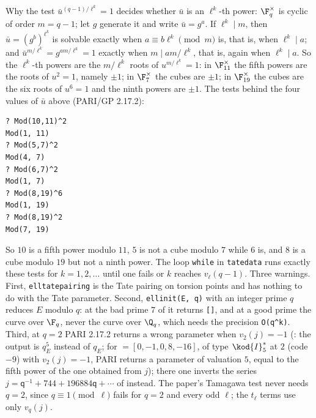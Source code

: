 \begin{sloppypar}
\begin{example}
Why the test $\bar u^{(q-1)/\ell^k}=1$ decides whether $\bar u$ is an $\ell^k$-th power: $\F_q^\times$ is cyclic of order $m=q-1$; let $g$ generate it and write
$\bar u=g^a$. If $\ell^k\mid m$, then $\bar u=(g^b)^{\ell^k}$ is solvable exactly when $a\equiv b\ell^k\pmod m$ is, that is, when $\ell^k\mid a$; and
$\bar u^{m/\ell^k}=g^{am/\ell^k}=1$ exactly when $m\mid am/\ell^k$, that is, again when $\ell^k\mid a$. So the $\ell^k$-th powers are the $m/\ell^k$ roots of
$u^{m/\ell^k}=1$: in $\F_{11}^\times$ the fifth powers are the roots of $u^2=1$, namely $\pm1$; in $\F_7^\times$ the cubes are $\pm1$; in $\F_{19}^\times$ the cubes are
the six roots of $u^6=1$ and the ninth powers are $\pm1$. The tests behind the four values of $\bar u$ above (PARI/GP 2.17.2):
\begin{lstlisting}[language=GP]
? Mod(10,11)^2
Mod(1, 11)
? Mod(5,7)^2
Mod(4, 7)
? Mod(6,7)^2
Mod(1, 7)
? Mod(8,19)^6
Mod(1, 19)
? Mod(8,19)^2
Mod(7, 19)
\end{lstlisting}
So $10$ is a fifth power modulo $11$, $5$ is not a cube modulo $7$ while $6$ is, and $8$ is a cube modulo $19$ but not a ninth power. The loop
\texttt{while} in \texttt{tatedata} runs exactly these tests for $k=1,2,\dots$ until one fails or $k$ reaches $v_\ell(q-1)$. Three warnings. First, \texttt{elltatepairing} is the
Tate pairing on torsion points and has nothing to do with the Tate parameter. Second, \texttt{ellinit(E, q)} with an integer prime $q$
reduces $E$ modulo $q$: at the bad prime $7$ of  it returns \texttt{[]}, and at a good prime the curve over $\F_q$, never the curve over
$\Q_q$, which needs the precision \texttt{O(q\^{}k)}. Third, at $q=2$ PARI 2.17.2 returns a wrong parameter when $v_2(j)=-1$
(: the output is $q_E^5$ instead of $q_E$; for  $=[0,-1,0,8,-16]$, of type $\kod{I}_5^*$ at $2$ (code $-9$) with $v_2(j)=-1$, PARI returns a parameter of
valuation $5$, equal to the fifth power of the one obtained from $j$); there one inverts the series $j=\mathsf q^{-1}+744+196884\mathsf q+\cdots$ of  instead. The paper's
Tamagawa test never needs $q=2$, since $q\equiv1\pmod\ell$ fails for $q=2$ and every odd $\ell$; the $t_\ell$ terms use only $v_q(j)$.
\end{example}


\end{sloppypar}
